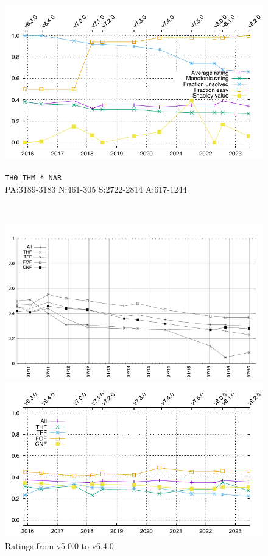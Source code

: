 \documentclass[runningheads]{llncs}
\begin{document}
\begin{figure}[t!]
\begin{minipage}[t]{.49\textwidth}
  \centering
  \includegraphics[width=\textwidth]{Plots/GNUPlots/TH0_THM_NAR.pdf}
  \vspace*{-2em}
  \caption{{\tt TH0\_THM\_*\_NAR} \\
           {\scriptsize PA:3189-3183 N:461-305 S:2722-2814 A:617-1244}}
  \label{Plot_TH0_THM_NAR}
\end{minipage}
\\
\begin{minipage}[t]{.49\textwidth}
  \centering
  \includegraphics[width=\textwidth]{Plots/RatingsDecline_v5.0.0_v6.4.0.pdf}
  \vspace*{-2em}
  \caption{Ratings from v5.0.0 to v6.4.0}
  \label{Ratings_v5.0.0_v6.4.0}
\end{minipage}
\begin{minipage}[t]{.49\textwidth}
  \centering
  \includegraphics[width=\textwidth]{Plots/RatingsDecline_v6.3.0_v8.2.0.pdf}

\end{minipage}
\end{figure}
\end{document}
